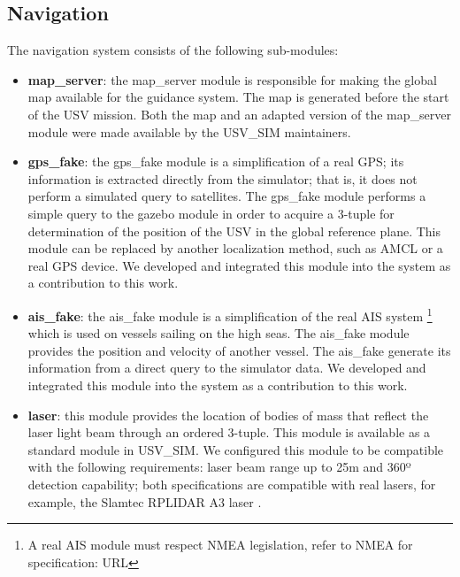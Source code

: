     \subsection{Navigation}
    The navigation system consists of the following sub-modules:
    
    \begin{itemize}
    
        \item \textbf{map\_server}: the map\_server module is responsible for making the global map available for the guidance system. The map is generated before the start of the \ac{USV} mission. Both the map and an adapted version of the map\_server module were made available by the USV\_SIM maintainers.
    
        \item \textbf{gps\_fake}: the gps\_fake module is a simplification of a real GPS; its information is extracted directly from the simulator; that is, it does not perform a simulated query to satellites. The gps\_fake module performs a simple query to the gazebo module in order to acquire a 3-tuple for determination of the position of the \ac{USV} in the global reference plane. This module can be replaced by another localization method, such as AMCL or a real GPS device. We developed and integrated this module into the system as a contribution to this work.
    
        \item \textbf{ais\_fake}: the ais\_fake module is a simplification of the real AIS system \footnote{A real AIS module must respect NMEA legislation, refer to NMEA for specification: URL} which is used on vessels sailing on the high seas. The ais\_fake module provides the position and velocity of another vessel. The ais\_fake generate its information from a direct query to the simulator data. We developed and integrated this module into the system as a contribution to this work.
    
        \item \textbf{laser}: this module provides the location of bodies of mass that reflect the laser light beam through an ordered 3-tuple. This module is available as a standard module in USV\_SIM. We configured this module to be compatible with the following requirements: laser beam range up to 25m and 360º detection capability; both specifications are compatible with real lasers, for example, the Slamtec RPLIDAR A3 laser \cite{RPLidarA3}.
    
    \end{itemize}
    
